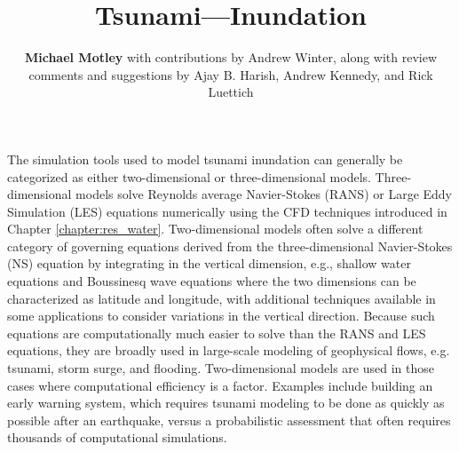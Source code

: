 %
%
%


\title{Tsunami---Inundation}
\author{
    \textbf{Michael Motley}
    with contributions by Andrew Winter,
    \newline
    along with review comments and suggestions by Ajay B. Harish, Andrew Kennedy, and Rick Luettich
}
\tocauthor{}
%
%
\maketitle
\label{chapter:haz_tsunami}

The simulation tools used to model tsunami inundation can generally be categorized as either two-dimensional or three-dimensional models. Three-dimensional models solve Reynolds average Navier-Stokes (RANS) or Large Eddy Simulation (LES) equations numerically using the CFD techniques introduced in Chapter \ref{chapter:res_water}. Two-dimensional models often solve a different category of governing equations derived from the three-dimensional Navier-Stokes (NS) equation by integrating in the vertical dimension, e.g., shallow water equations and Boussinesq wave equations where the two dimensions can be characterized as latitude and longitude, with additional techniques available in some applications to consider variations in the vertical direction. Because such equations are computationally much easier to solve than the RANS and LES equations, they are broadly used in large-scale modeling of geophysical flows, e.g. tsunami, storm surge, and flooding. Two-dimensional models are used in those cases where computational efficiency is a factor. Examples include building an early warning system, which requires tsunami modeling to be done as quickly as possible after an earthquake, versus a probabilistic assessment that often requires thousands of computational simulations.

